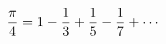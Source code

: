 \documentclass[preview]{standalone}
\begin{document}
\begin{align*}
\special{dvisvgm:raw <g id='unique000'>}\dfrac{\pi}{4}=1-\dfrac{1}{3}+\dfrac{1}{5}-\dfrac{1}{7}+\cdots\special{dvisvgm:raw </g>}
\end{align*}
\end{document}
